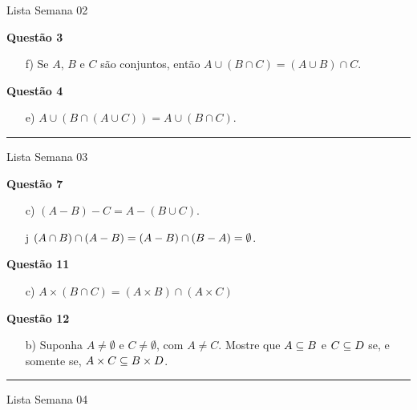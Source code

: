 \documentclass[12pt]{exam}
\begin{document}
    \vspace{.6cm}

    \begin{center}
        Lista Semana 02
    \end{center}
    \noindent \textbf{Questão 3}
    \begin{enumerate}
        \item[f)] Se $A$, $B$ e $C$ s\~ao conjuntos, ent\~ao $A \cup (B \cap C) = (A \cup B) \cap C$.
    \end{enumerate}
    
    \vspace{.3cm}

    \noindent \textbf{Questão 4}
    \begin{enumerate}
        \item[e)] $A \cup (B \cap (A \cup C)) = A \cup (B \cap C)$.
    \end{enumerate}

    \hrule
    \begin{center}
        Lista Semana 03
    \end{center}

    \noindent \textbf{Questão 7}
    \begin{enumerate}
        \item[c)] $(A - B) - C = A - (B \cup C)$.

        \item[j] $(A \cap B) \cap (A - B) = (A - B) \cap (B - A) = \emptyset$.
    \end{enumerate}

    \vspace{.3cm}

    \noindent \textbf{Questão 11}
    \begin{enumerate}
        \item[c)] $A \times (B \cap C) = (A \times B) \cap (A \times C)$
    \end{enumerate}

    \vspace{.3cm}

    \noindent \textbf{Questão 12}
    \begin{enumerate}
        \item[b)] Suponha $A \ne \emptyset$ e $C \ne \emptyset$, com $A \ne C$. Mostre que $A \subseteq B$ e $C \subseteq D$ se, e somente se, $A \times C \subseteq B \times D$.
    \end{enumerate}

    \hrule
    \begin{center}
        Lista Semana 04
    \end{center}
\end{document}
